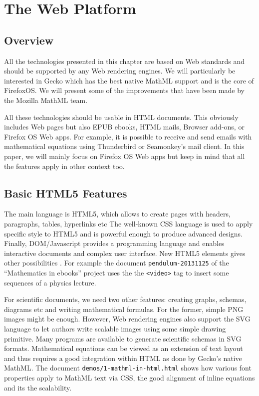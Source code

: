 \chapter{The Web Platform}

\section{Overview}

All the technologies presented in this chapter are based on Web standards and
should be supported by any Web rendering engines. We will particularly be
interested in Gecko which has the best native MathML support and is the core
of FirefoxOS. We will present some of the improvements that have been made
by the Mozilla MathML team.

All these technologies should be usable in HTML documents. This obviously
includes Web pages but also EPUB ebooks, HTML mails, Browser add-ons, or
Firefox OS Web apps. For example, it is possible to receive and send emails
with mathematical equations using Thunderbird or Seamonkey's mail client.
In this paper, we will mainly
focus on Firefox OS Web apps but keep in mind that all the features apply in
other context too.

\section{Basic HTML5 Features}

The main language is HTML5, which allows to create pages with headers,
paragraphs, tables, hyperlinks etc The well-known CSS language is used to
apply specific style to HTML5 and is powerful enough to produce advanced
designs. Finally, DOM/Javascript provides a programming language and enables
interactive documents and complex user interface. New HTML5 elements
gives other possibilities . For example the document
{\tt pendulum-20131125} of the ``Mathematics in ebooks'' project uses the
the {\tt <video>} tag to insert some sequences of a physics lecture.

For scientific documents, we need two other features: creating graphs, schemas,
diagrams etc and writing mathematical formulas. For the former, simple PNG
images might be enough. However, Web rendering engines also support the SVG
language to let authors write scalable images using some simple drawing
primitive. Many programs are available to generate scientific schemas in SVG
formats. Mathematical equations can be viewed as an extension of text layout
and thus requires a good integration within HTML as done by
Gecko's native MathML. The document {\tt demos/1-mathml-in-html.html} shows how
various font properties apply to MathML text via CSS, the good alignment
of inline equations and its the scalability.

